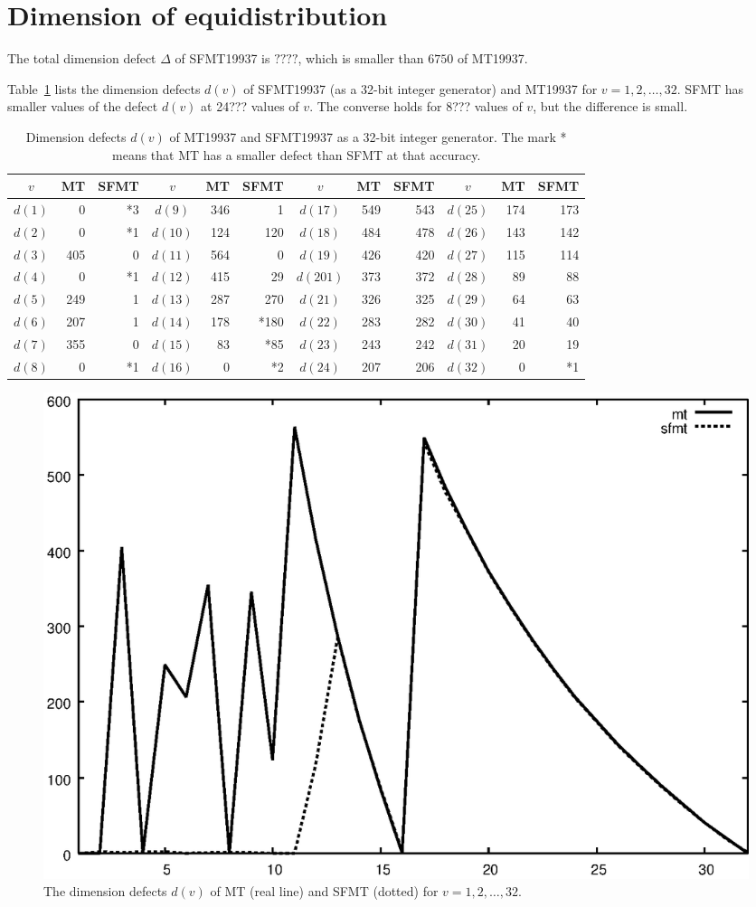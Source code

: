 \documentclass[acmnow]{acmtrans2m}
\begin{document}
\section{Dimension of equidistribution}
The total dimension defect $\Delta$ of SFMT19937
is $????$, which is smaller than $6750$ of MT19937.

Table~\ref{tab:dd} lists the dimension defects $d(v)$
of SFMT19937 (as a 32-bit integer generator) 
and MT19937 for $v=1,2,\ldots, 32$.
SFMT has smaller values of the defect $d(v)$
at 24??? values of $v$. The converse holds for 8??? values of
$v$, but the difference is small.
\begin{table}
\begin{tabular}{|c|rr||c|rr||c|rr||c|rr|} \hline
$v$ & MT & SFMT & $v$ & MT & SFMT & $v$ & MT & SFMT & $v$ & MT & SFMT\\ \hline
$d(1)$& 0 & *3
 &$d(9)$& 346 & 1 & $d(17)$ & 549 & 543 & $d(25)$ & 174 & 173\\
$d(2)$& 0 & *1 
&$d(10)$& 124 & 120 & $d(18)$ & 484 & 478 & $d(26)$ & 143 & 142\\
$d(3)$& 405 & 0 &$d(11)$& 564 & 0 & $d(19)$ & 426 & 420 & $d(27)$ & 115 & 114\\
$d(4)$& 0 & *1
 &$d(12)$& 415 & 29 & $d(201)$ & 373 & 372 & $d(28)$ & 89 & 88\\
$d(5)$& 249 & 1 &$d(13)$& 287 & 270 & $d(21)$ & 326 & 325 & $d(29)$ & 64 & 63\\
$d(6)$& 207 & 1 &$d(14)$& 178 & *180
 & $d(22)$ & 283 & 282 & $d(30)$ & 41 & 40\\
$d(7)$& 355 & 0 &$d(15)$& 83 & *85
 & $d(23)$ & 243 & 242 & $d(31)$ & 20 & 19\\
$d(8)$& 0 & *1 &$d(16)$& 0 & *2
 & $d(24)$ & 207 & 206 & $d(32)$ & 0 & *1 \\ \hline
\end{tabular}
\caption{Dimension defects 
$d(v)$ of MT19937 and SFMT19937
as a 32-bit integer generator.
The mark * means that MT has a smaller defect than SFMT
at that accuracy.
}\label{tab:dd}
\end{table}

\begin{figure}
\begin{center}
\includegraphics[width=0.8\linewidth,height=0.7\textheight,
keepaspectratio]{delta.eps}
\end{center}
\caption{The dimension defects $d(v)$ of MT (real line) and SFMT (dotted)
for $v=1,2,\ldots, 32$.}
\end{figure}
\end{document}
